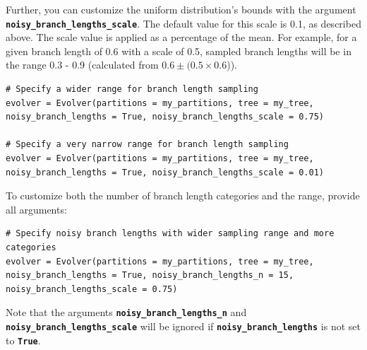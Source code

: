 \documentclass{article}
\newcommand{\code}[1]{\textbf{\texttt{\small{#1}}}}
\newcommand\pythonexternal[2][]{{
		}}
\begin{document}
Further, you can customize the uniform distribution's bounds with the argument \\ \code{noisy\_branch\_lengths\_scale}. The default value for this scale is 0.1, as described above. The scale value is applied as a percentage of the mean. For example, for a given branch length of 0.6 with a scale of 0.5, sampled branch lengths will be in the range 0.3 - 0.9 (calculated from $0.6 \pm (0.5\times0.6$)).
\begin{lstlisting}
# Specify a wider range for branch length sampling
evolver = Evolver(partitions = my_partitions, tree = my_tree, noisy_branch_lengths = True, noisy_branch_lengths_scale = 0.75)

# Specify a very narrow range for branch length sampling
evolver = Evolver(partitions = my_partitions, tree = my_tree, noisy_branch_lengths = True, noisy_branch_lengths_scale = 0.01)
\end{lstlisting}

To customize both the number of branch length categories and the range, provide all arguments:
\begin{lstlisting}
# Specify noisy branch lengths with wider sampling range and more categories
evolver = Evolver(partitions = my_partitions, tree = my_tree, noisy_branch_lengths = True, noisy_branch_lengths_n = 15, noisy_branch_lengths_scale = 0.75)
\end{lstlisting}


Note that the arguments \code{noisy\_branch\_lengths\_n} and \code{noisy\_branch\_lengths\_scale} will be ignored if \code{noisy\_branch\_lengths} is not set to \code{True}.


%
















\end{document}
